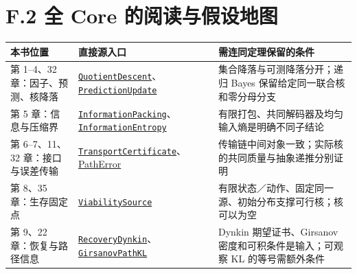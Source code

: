 \documentclass[
  11pt,
  oneside]{book}
\newcounter{none} %
\begin{document}
\section{F.2 全 Core 的阅读与假设地图}\label{f-core-map}

{\def\LTcaptype{none} %
\begin{longtable}[]{@{}
  >{\raggedright\arraybackslash}p{}
  >{\raggedright\arraybackslash}p{}
  >{\raggedright\arraybackslash}p{}@{}}
\toprule\noalign{}
\begin{minipage}[b]{\linewidth}\raggedright
本书位置
\end{minipage} & \begin{minipage}[b]{\linewidth}\raggedright
直接源入口
\end{minipage} & \begin{minipage}[b]{\linewidth}\raggedright
需连同定理保留的条件
\end{minipage} \\
\midrule\noalign{}
\endhead
\bottomrule\noalign{}
\endlastfoot
第 1--4、32 章：因子、预测、核降落 & \href{../formalization/ueot-core/UEOT/V3/Compression/QuotientDescent.lean}{\nolinkurl{QuotientDescent}}、\href{../formalization/ueot-core/UEOT/V3/PredictionUpdate.lean}{\nolinkurl{PredictionUpdate}} & 集合降落与可测降落分开；递归 Bayes 保留给定同一联合核和零分母分支 \\
第 5 章：信息与压缩界 & \href{../formalization/ueot-core/UEOT/V3/InformationPacking.lean}{\nolinkurl{InformationPacking}}、\href{../formalization/ueot-core/UEOT/V3/InformationEntropy.lean}{\nolinkurl{InformationEntropy}} & 有限打包、共同解码器及均匀输入熵是明确不同子结论 \\
第 6--7、11、32 章：接口与误差传输 & \href{../formalization/ueot-core/UEOT/V3/Compression/TransportCertificate.lean}{\nolinkurl{TransportCertificate}}、\href{../formalization/ueot-core/UEOT/V3/PathError.lean}{PathError} & 传输链中间对象一致；实际核的共同质量与抽象递推分别证明 \\
第 8、35 章：生存固定点 & \href{../formalization/ueot-core/UEOT/V3/ViabilitySource.lean}{\nolinkurl{ViabilitySource}} & 有限状态／动作、固定同一源、初始分布支撑可行核；核可以为空 \\
第 9、22 章：恢复与路径信息 & \href{../formalization/ueot-core/UEOT/V3/RecoveryDynkin.lean}{\nolinkurl{RecoveryDynkin}}、\href{../formalization/ueot-core/UEOT/V3/GirsanovPathKL.lean}{\nolinkurl{GirsanovPathKL}} & Dynkin 期望证书、Girsanov 密度和可积条件是输入；可观察 KL 的等号需额外条件 \\

\end{longtable}}
\end{document}

